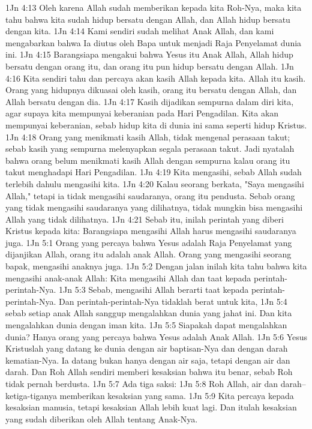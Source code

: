 1Jn 4:13  Oleh karena Allah sudah memberikan kepada kita Roh-Nya, maka kita tahu bahwa kita sudah hidup bersatu dengan Allah, dan Allah hidup bersatu dengan kita.
1Jn 4:14  Kami sendiri sudah melihat Anak Allah, dan kami mengabarkan bahwa Ia diutus oleh Bapa untuk menjadi Raja Penyelamat dunia ini.
1Jn 4:15  Barangsiapa mengakui bahwa Yesus itu Anak Allah, Allah hidup bersatu dengan orang itu, dan orang itu pun hidup bersatu dengan Allah.
1Jn 4:16  Kita sendiri tahu dan percaya akan kasih Allah kepada kita. Allah itu kasih. Orang yang hidupnya dikuasai oleh kasih, orang itu bersatu dengan Allah, dan Allah bersatu dengan dia.
1Jn 4:17  Kasih dijadikan sempurna dalam diri kita, agar supaya kita mempunyai keberanian pada Hari Pengadilan. Kita akan mempunyai keberanian, sebab hidup kita di dunia ini sama seperti hidup Kristus.
1Jn 4:18  Orang yang menikmati kasih Allah, tidak mengenal perasaan takut; sebab kasih yang sempurna melenyapkan segala perasaan takut. Jadi nyatalah bahwa orang belum menikmati kasih Allah dengan sempurna kalau orang itu takut menghadapi Hari Pengadilan.
1Jn 4:19  Kita mengasihi, sebab Allah sudah terlebih dahulu mengasihi kita.
1Jn 4:20  Kalau seorang berkata, "Saya mengasihi Allah," tetapi ia tidak mengasihi saudaranya, orang itu pendusta. Sebab orang yang tidak mengasihi saudaranya yang dilihatnya, tidak mungkin bisa mengasihi Allah yang tidak dilihatnya.
1Jn 4:21  Sebab itu, inilah perintah yang diberi Kristus kepada kita: Barangsiapa mengasihi Allah harus mengasihi saudaranya juga.
1Jn 5:1  Orang yang percaya bahwa Yesus adalah Raja Penyelamat yang dijanjikan Allah, orang itu adalah anak Allah. Orang yang mengasihi seorang bapak, mengasihi anaknya juga.
1Jn 5:2  Dengan jalan inilah kita tahu bahwa kita mengasihi anak-anak Allah: Kita mengasihi Allah dan taat kepada perintah-perintah-Nya.
1Jn 5:3  Sebab, mengasihi Allah berarti taat kepada perintah-perintah-Nya. Dan perintah-perintah-Nya tidaklah berat untuk kita,
1Jn 5:4  sebab setiap anak Allah sanggup mengalahkan dunia yang jahat ini. Dan kita mengalahkan dunia dengan iman kita.
1Jn 5:5  Siapakah dapat mengalahkan dunia? Hanya orang yang percaya bahwa Yesus adalah Anak Allah.
1Jn 5:6  Yesus Kristuslah yang datang ke dunia dengan air baptisan-Nya dan dengan darah kematian-Nya. Ia datang bukan hanya dengan air saja, tetapi dengan air dan darah. Dan Roh Allah sendiri memberi kesaksian bahwa itu benar, sebab Roh tidak pernah berdusta.
1Jn 5:7  Ada tiga saksi:
1Jn 5:8  Roh Allah, air dan darah--ketiga-tiganya memberikan kesaksian yang sama.
1Jn 5:9  Kita percaya kepada kesaksian manusia, tetapi kesaksian Allah lebih kuat lagi. Dan itulah kesaksian yang sudah diberikan oleh Allah tentang Anak-Nya.
